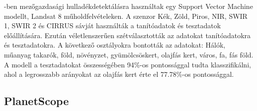 \cite{lanorte2017}-ben mezőgazdasági hulladékdetektálásra használtak egy Support Vector Machine modellt, Landsat 8 műholdfelvételeken. A szenzor Kék, Zöld, Piros, NIR, SWIR 1, SWIR 2 és CIRRUS sávját használták a tanítóadatok és tesztadatok előállítására. Ezután véletlenszerűen szétválasztották az adatokat tanítóadatokra és tesztadatokra. A következő osztályokra bontották az adatokat: Hálók, műanyag takarók, föld, növényzet, gyümölcsöskert, olajfás kert, város, fa, fás föld. A modell a tesztadatokat összességében 94\%-os pontossággal tudta klasszifikálni, ahol a legrosszabb arányokat az olajfás kert érte el 77.78\%-os pontossággal.

\subsection{PlanetScope}


